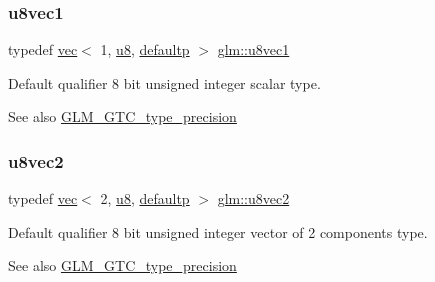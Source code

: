 \subsubsection{\texorpdfstring{u8vec1}{u8vec1}}
{\footnotesize\ttfamily typedef \mbox{\hyperlink{structglm_1_1vec}{vec}}$<$ 1, \mbox{\hyperlink{group__gtc__type__precision_ga5e3dc67373d5068997d2d9f41c9024d2}{u8}}, \mbox{\hyperlink{namespaceglm_a36ed105b07c7746804d7fdc7cc90ff25a9d21ccd8b5a009ec7eb7677befc3bf51}{defaultp}} $>$ \mbox{\hyperlink{group__gtc__type__precision_ga5b0875b5979b80a0ccb371bf7f0f95d8}{glm\+::u8vec1}}}

Default qualifier 8 bit unsigned integer scalar type. \begin{DoxySeeAlso}{See also}
\mbox{\hyperlink{group__gtc__type__precision}{G\+L\+M\+\_\+\+G\+T\+C\+\_\+type\+\_\+precision}} 
\end{DoxySeeAlso}
\mbox{\label{group__gtc__type__precision_ga01e28d0272428f94d22ea6111f0112be}} 
\subsubsection{\texorpdfstring{u8vec2}{u8vec2}}
{\footnotesize\ttfamily typedef \mbox{\hyperlink{structglm_1_1vec}{vec}}$<$ 2, \mbox{\hyperlink{group__gtc__type__precision_ga5e3dc67373d5068997d2d9f41c9024d2}{u8}}, \mbox{\hyperlink{namespaceglm_a36ed105b07c7746804d7fdc7cc90ff25a9d21ccd8b5a009ec7eb7677befc3bf51}{defaultp}} $>$ \mbox{\hyperlink{group__gtc__type__precision_ga01e28d0272428f94d22ea6111f0112be}{glm\+::u8vec2}}}

Default qualifier 8 bit unsigned integer vector of 2 components type. \begin{DoxySeeAlso}{See also}
\mbox{\hyperlink{group__gtc__type__precision}{G\+L\+M\+\_\+\+G\+T\+C\+\_\+type\+\_\+precision}} 
\end{DoxySeeAlso}
\mbox{\label{group__gtc__type__precision_gaa86b325e581afdc643495fbe428c1f1b}} 
